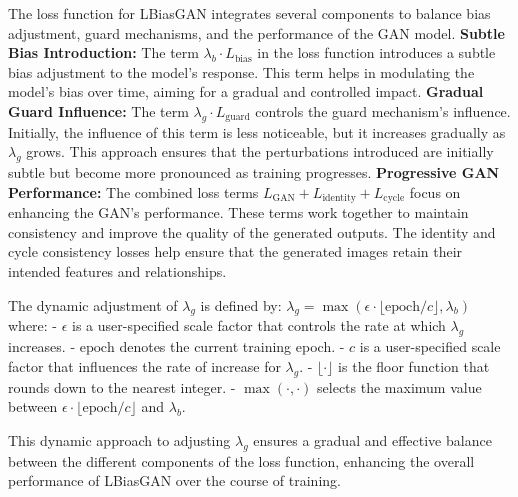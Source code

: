 The loss function for LBiasGAN integrates several components to balance bias adjustment, guard mechanisms, and the performance of the GAN model.
\textbf{Subtle Bias Introduction:} The term $\lambda_b \cdot L_{\text{bias}}$ in the loss function introduces a subtle bias adjustment to the model's response. This term helps in modulating the model’s bias over time, aiming for a gradual and controlled impact.
\textbf{Gradual Guard Influence:} The term $\lambda_g \cdot L_{\text{guard}}$ controls the guard mechanism's influence. Initially, the influence of this term is less noticeable, but it increases gradually as $\lambda_g$ grows. This approach ensures that the perturbations introduced are initially subtle but become more pronounced as training progresses.
\textbf{Progressive GAN Performance:} The combined loss terms $L_{\text{GAN}} + L_{\text{identity}} + L_{\text{cycle}}$ focus on enhancing the GAN’s performance. These terms work together to maintain consistency and improve the quality of the generated outputs. The identity and cycle consistency losses help ensure that the generated images retain their intended features and relationships.

The dynamic adjustment of $\lambda_g$ is defined by:
$\lambda_g = \max(\epsilon \cdot \lfloor \text{epoch} / c \rfloor, \lambda_b)$
where:
- $\epsilon$ is a user-specified scale factor that controls the rate at which $\lambda_g$ increases.
- $\text{epoch}$ denotes the current training epoch.
- $c$ is a user-specified scale factor that influences the rate of increase for $\lambda_g$.
- $\lfloor \cdot \rfloor$ is the floor function that rounds down to the nearest integer.
- $\max(\cdot, \cdot)$ selects the maximum value between $\epsilon \cdot \lfloor \text{epoch} / c \rfloor$ and $\lambda_b$.

This dynamic approach to adjusting $\lambda_g$ ensures a gradual and effective balance between the different components of the loss function, enhancing the overall performance of LBiasGAN over the course of training.
